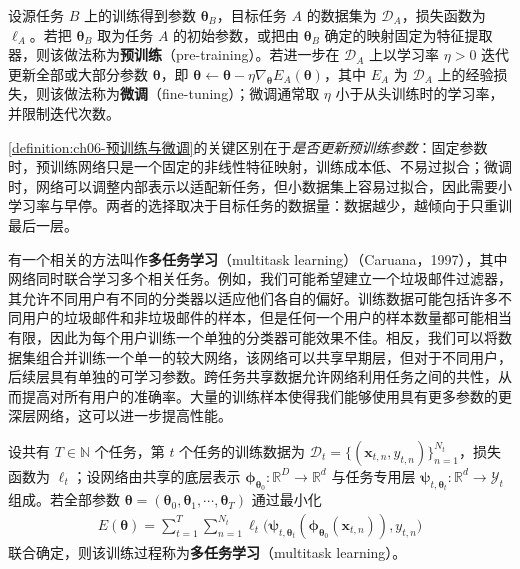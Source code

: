 \documentclass[../../main.tex]{subfiles}
\begin{document}
\begin{definition}[预训练与微调]\label{definition:ch06-预训练与微调}
设源任务 $B$ 上的训练得到参数 $\boldsymbol{\theta}_{B}$，目标任务 $A$ 的数据集为 $\mathcal{D}_{A}$，损失函数为 $\ell_{A}$。若把 $\boldsymbol{\theta}_{B}$ 取为任务 $A$ 的初始参数，或把由 $\boldsymbol{\theta}_{B}$ 确定的映射固定为特征提取器，则该做法称为\textbf{预训练}（pre-training）。若进一步在 $\mathcal{D}_{A}$ 上以学习率 $\eta>0$ 迭代更新全部或大部分参数 $\boldsymbol{\theta}$，即 $\boldsymbol{\theta}\leftarrow\boldsymbol{\theta}-\eta\nabla_{\boldsymbol{\theta}}E_{A}(\boldsymbol{\theta})$，其中 $E_{A}$ 为 $\mathcal{D}_{A}$ 上的经验损失，则该做法称为\textbf{微调}（fine-tuning）；微调通常取 $\eta$ 小于从头训练时的学习率，并限制迭代次数。
\end{definition}

\begin{remark}\cref{definition:ch06-预训练与微调}的关键区别在于\emph{是否更新预训练参数}：固定参数时，预训练网络只是一个固定的非线性特征映射，训练成本低、不易过拟合；微调时，网络可以调整内部表示以适配新任务，但小数据集上容易过拟合，因此需要小学习率与早停。两者的选择取决于目标任务的数据量：数据越少，越倾向于只重训最后一层。
\end{remark}

有一个相关的方法叫作\textbf{多任务学习}（multitask learning）（Caruana，1997），其中网络同时联合学习多个相关任务。例如，我们可能希望建立一个垃圾邮件过滤器，其允许不同用户有不同的分类器以适应他们各自的偏好。训练数据可能包括许多不同用户的垃圾邮件和非垃圾邮件的样本，但是任何一个用户的样本数量都可能相当有限，因此为每个用户训练一个单独的分类器可能效果不佳。相反，我们可以将数据集组合并训练一个单一的较大网络，该网络可以共享早期层，但对于不同用户，后续层具有单独的可学习参数。跨任务共享数据允许网络利用任务之间的共性，从而提高对所有用户的准确率。大量的训练样本使得我们能够使用具有更多参数的更深层网络，这可以进一步提高性能。

\begin{definition}[多任务学习]\label{definition:ch06-多任务学习}
设共有 $T\in\mathbb{N}$ 个任务，第 $t$ 个任务的训练数据为 $\mathcal{D}_{t}=\{(\boldsymbol{x}_{t,n},y_{t,n})\}_{n=1}^{N_{t}}$，损失函数为 $\ell_{t}$；设网络由共享的底层表示 $\boldsymbol{\phi}_{\boldsymbol{\theta}_{0}}:\mathbb{R}^{D}\to\mathbb{R}^{d}$ 与任务专用层 $\boldsymbol{\psi}_{t,\boldsymbol{\theta}_{t}}:\mathbb{R}^{d}\to\mathcal{Y}_{t}$ 组成。若全部参数 $\boldsymbol{\theta}=(\boldsymbol{\theta}_{0},\boldsymbol{\theta}_{1},\cdots,\boldsymbol{\theta}_{T})$ 通过最小化
\begin{align}
E(\boldsymbol{\theta})=\sum_{t=1}^{T}\sum_{n=1}^{N_{t}}\ell_t\bigl(\boldsymbol{\psi}_{t,\boldsymbol{\theta}_{t}}(\boldsymbol{\phi}_{\boldsymbol{\theta}_{0}}(\boldsymbol{x}_{t,n})),y_{t,n}\bigr)
\label{align:ch06-多任务目标}
\end{align}
联合确定，则该训练过程称为\textbf{多任务学习}（multitask learning）。
\end{definition}
\end{document}
